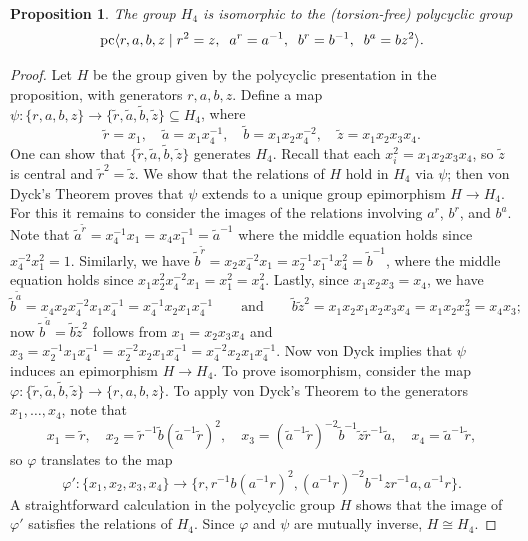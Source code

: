 \documentclass[11pt]{amsart}
\theoremstyle{mythm}
\newtheorem{proposition}[theorem]{Proposition}
\theoremstyle{mydef}
\theoremstyle{myrem}
\numberwithin{equation}{section}
\newcommand{\la}{\langle}
\newcommand{\ra}{\rangle}
\begin{document}
\begin{proposition}\label{prop_pc}The group $H_4$ is isomorphic to the (torsion-free) polycyclic group
\[ 
{\rm pc}\la r,a,b,z  \mid r^2=z,\;\; a^r = a^{-1},\;\; b^r = b^{-1},\;\; b^a =bz^2  \ra.
\]
\end{proposition}


\begin{proof} 
Let $H$ be the group given by the polycyclic presentation in the proposition, with generators $r,a,b,z$.    Define a map $\psi\colon \{r,a,b,z\}\to \{\tilde r,\tilde a, \tilde b, \tilde z\}\subseteq H_4$, where
  \[
  \tilde r=x_1,\quad \tilde a= x_1x_4^{-1}, \quad\tilde b=x_1x_2x_4^{-2}, \quad \tilde z=x_1x_2x_3x_4.
  \]
  One can show that $\{\tilde r,\tilde a,\tilde b,\tilde z\}$ generates $H_4$. Recall that each   $x_i^2=x_1x_2x_3x_4$, so $\tilde z$ is central and $\tilde r^2=\tilde z$. We show that the relations of $H$ hold in $H_4$ via $\psi$; then von Dyck's Theorem \cite[Theorem 2.53]{handbook} proves that $\psi$ extends to a unique group epimorphism $H\to H_4$. For this it remains to consider the images of the relations involving $a^{r}$, $b^r$, and $b^a$. Note that $\tilde a^{\tilde r}=x_4^{-1}x_1=x_4x_1^{-1}=\tilde a^{-1}$ where the middle equation holds since   $x_4^{-2}x_1^{2}=1$. Similarly, we have $\tilde b^{\tilde r} = x_2x_4^{-2}x_1 = x_2^{-1} x_1^{-1}x_4^2 = \tilde b^{-1}$, where the middle equation holds since $x_1x_2^2x_4^{-2}x_1=x_1^2=x_4^2$. Lastly, since $x_1x_2x_3=x_4$, we have
  \[\tilde b^{\tilde a}=x_4 x_2 x_4^{-2}x_1x_4^{-1}=x_4^{-1}x_2x_1x_4^{-1} \qquad \textrm{and} \qquad \tilde b\tilde z^2=x_1x_2x_1x_2x_3x_4=x_1x_2x_3^2=x_4x_3;\]
 now $\tilde b^{\tilde a}=\tilde b\tilde z^2$ follows from $x_1=x_2x_3x_4$ and $x_3=x_2^{-1}x_1x_4^{-1}=x_2^{-2}x_2x_1x_4^{-1}=x_4^{-2}x_2x_1x_4^{-1}$. Now von Dyck implies that $\psi$ induces an epimorphism $H\to H_4$. To prove isomorphism, consider the map $\varphi\colon \{\tilde r,\tilde a,\tilde b,\tilde z\}\to \{r,a,b,z\}$. To apply von Dyck's Theorem to the generators $x_1,\ldots,x_4$, note that
  \[x_1=\tilde r,\quad x_2=\tilde r^{-1} \tilde b (\tilde a^{-1}\tilde r)^2 ,\quad  x_3= (\tilde a^{-1}\tilde r)^{-2}\tilde b^{-1}\tilde z \tilde r^{-1}\tilde a,\quad x_4=\tilde a^{-1}\tilde r,\]so $\varphi$ translates to the map \[\varphi'\colon \{x_1,x_2,x_3,x_4\}\to \{r, r^{-1} b ( a^{-1} r)^2, (a^{-1} r)^{-2}b^{-1} z r^{-1} a, a^{-1}r \}.\] A straightforward calculation in the polycyclic group $H$ shows that the image of $\varphi'$ satisfies the relations of $H_4$. Since $\varphi$ and $\psi$ are mutually inverse, $H\cong H_4$.  
\end{proof}
\end{document}
